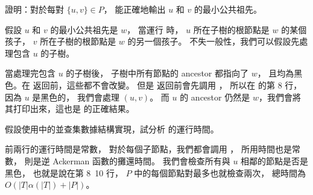 \startigBase[continue]\startitem
證明：對於每對 $\{u,v\}\in P$，  能正確地輸出 $u$ 和 $v$ 的最小公共祖先。
\stopitem\stopigBase

\startANSWER
假設 $u$ 和 $v$ 的最小公共祖先是 $w$，
當運行  時， $u$ 所在子樹的根節點是 $w$ 的某個孩子，
 $v$ 所在子樹的根節點是 $w$ 的另一個孩子。
不失一般性，我們可以假設先處理包含 $u$ 的子樹。

當處理完包含 $u$ 的子樹後，
子樹中所有節點的 ancestor 都指向了 $w$，
且均為黑色。在  返回前，這些都不會改變。
但是  返回前會先調用 ，
所以在  的第 8 行，因為 $u$ 是黑色的，
我們會處理 $(u, v)$。
而 $u$ 的 ancestor 仍然是 $w$，我們會將其打印出來，這也是  的正確結果。
\stopANSWER

\startigBase[continue]\startitem
假設使用 中的並查集數據結構實現，試分析  的運行時間。
\stopitem\stopigBase

\startANSWER
前兩行的運行時間是常數，
對於每個子節點，我們都會調用 ，
 所用時間也是常數，
 則是逆 Ackerman 函數的攤還時間。
我們會檢查所有與 $u$ 相鄰的節點是否是黑色，
也就是說在第 8~10 行， $P$ 中的每個節點對最多也就檢查兩次，
總時間為 $O(|T|\alpha(|T|) + |P|)$。
\stopANSWER

\stopPROBLEM
